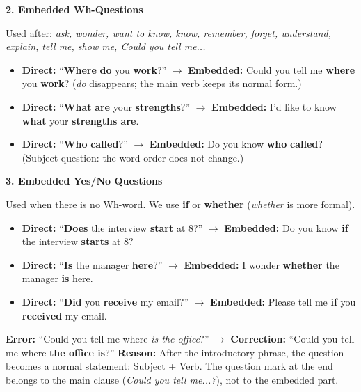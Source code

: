 \documentclass[11pt]{article}
\begin{document}
\textbf{2. Embedded Wh-Questions}\par
Used after: \emph{ask, wonder, want to know, know, remember, forget, understand, explain, tell me, show me, Could you tell me...}
\begin{exemplebox}
\begin{itemize}
    \item \textbf{Direct:} ``\textbf{Where} \textbf{do} you \textbf{work}?'' $\rightarrow$ \textbf{Embedded:} Could you tell me \textbf{where} you \textbf{work}? (\emph{do} disappears; the main verb keeps its normal form.)
    \item \textbf{Direct:} ``\textbf{What} \textbf{are} your \textbf{strengths}?'' $\rightarrow$ \textbf{Embedded:} I'd like to know \textbf{what} your \textbf{strengths are}.
    \item \textbf{Direct:} ``\textbf{Who} \textbf{called}?'' $\rightarrow$ \textbf{Embedded:} Do you know \textbf{who} \textbf{called}? (Subject question: the word order does not change.)
\end{itemize}
\end{exemplebox}

\textbf{3. Embedded Yes/No Questions}\par
Used when there is no Wh-word. We use \textbf{if} or \textbf{whether} (\emph{whether} is more formal).
\begin{exemplebox}
\begin{itemize}
    \item \textbf{Direct:} ``\textbf{Does} the interview \textbf{start} at 8?'' $\rightarrow$ \textbf{Embedded:} Do you know \textbf{if} the interview \textbf{starts} at 8?
    \item \textbf{Direct:} ``\textbf{Is} the manager \textbf{here}?'' $\rightarrow$ \textbf{Embedded:} I wonder \textbf{whether} the manager \textbf{is} here.
    \item \textbf{Direct:} ``\textbf{Did} you \textbf{receive} my email?'' $\rightarrow$ \textbf{Embedded:} Please tell me \textbf{if} you \textbf{received} my email.
\end{itemize}
\end{exemplebox}

\begin{attention}
\textbf{Error:} ``Could you tell me where \emph{is the office}?'' $\rightarrow$ \textbf{Correction:} ``Could you tell me where \textbf{the office is}?''
\textbf{Reason:} After the introductory phrase, the question becomes a normal statement: Subject + Verb. The question mark at the end belongs to the main clause (\emph{Could you tell me...?}), not to the embedded part.
\end{attention}
\end{document}
